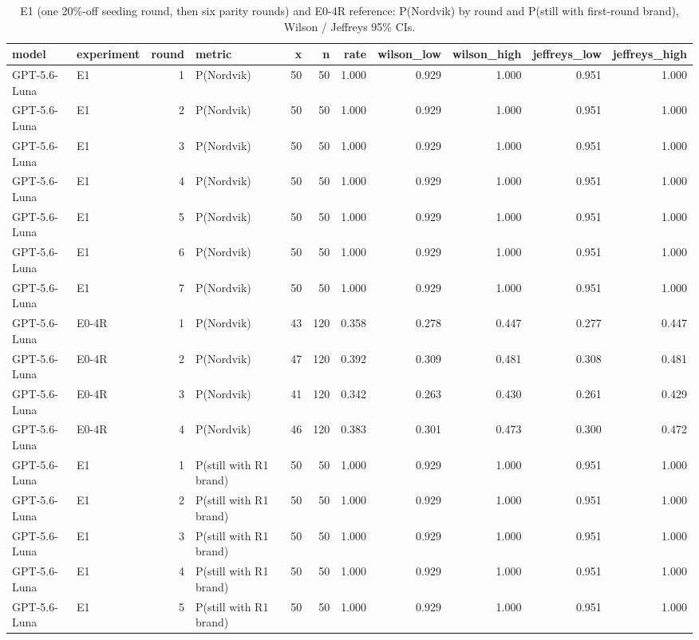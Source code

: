 \begin{table}[htbp]
\centering
\scriptsize
\caption{E1 (one 20\%-off seeding round, then six parity rounds) and E0-4R reference: P(Nordvik) by round and P(still with first-round brand), Wilson / Jeffreys 95\% CIs.}
\label{tab:tab07_e1_decay_curves}
\begin{tabular}{llrlrrrrrrr}
\toprule
model & experiment & round & metric & x & n & rate & wilson\_low & wilson\_high & jeffreys\_low & jeffreys\_high \\
\midrule
GPT-5.6-Luna & E1 & 1 & P(Nordvik) & 50 & 50 & 1.000 & 0.929 & 1.000 & 0.951 & 1.000 \\
GPT-5.6-Luna & E1 & 2 & P(Nordvik) & 50 & 50 & 1.000 & 0.929 & 1.000 & 0.951 & 1.000 \\
GPT-5.6-Luna & E1 & 3 & P(Nordvik) & 50 & 50 & 1.000 & 0.929 & 1.000 & 0.951 & 1.000 \\
GPT-5.6-Luna & E1 & 4 & P(Nordvik) & 50 & 50 & 1.000 & 0.929 & 1.000 & 0.951 & 1.000 \\
GPT-5.6-Luna & E1 & 5 & P(Nordvik) & 50 & 50 & 1.000 & 0.929 & 1.000 & 0.951 & 1.000 \\
GPT-5.6-Luna & E1 & 6 & P(Nordvik) & 50 & 50 & 1.000 & 0.929 & 1.000 & 0.951 & 1.000 \\
GPT-5.6-Luna & E1 & 7 & P(Nordvik) & 50 & 50 & 1.000 & 0.929 & 1.000 & 0.951 & 1.000 \\
GPT-5.6-Luna & E0-4R & 1 & P(Nordvik) & 43 & 120 & 0.358 & 0.278 & 0.447 & 0.277 & 0.447 \\
GPT-5.6-Luna & E0-4R & 2 & P(Nordvik) & 47 & 120 & 0.392 & 0.309 & 0.481 & 0.308 & 0.481 \\
GPT-5.6-Luna & E0-4R & 3 & P(Nordvik) & 41 & 120 & 0.342 & 0.263 & 0.430 & 0.261 & 0.429 \\
GPT-5.6-Luna & E0-4R & 4 & P(Nordvik) & 46 & 120 & 0.383 & 0.301 & 0.473 & 0.300 & 0.472 \\
GPT-5.6-Luna & E1 & 1 & P(still with R1 brand) & 50 & 50 & 1.000 & 0.929 & 1.000 & 0.951 & 1.000 \\
GPT-5.6-Luna & E1 & 2 & P(still with R1 brand) & 50 & 50 & 1.000 & 0.929 & 1.000 & 0.951 & 1.000 \\
GPT-5.6-Luna & E1 & 3 & P(still with R1 brand) & 50 & 50 & 1.000 & 0.929 & 1.000 & 0.951 & 1.000 \\
GPT-5.6-Luna & E1 & 4 & P(still with R1 brand) & 50 & 50 & 1.000 & 0.929 & 1.000 & 0.951 & 1.000 \\
GPT-5.6-Luna & E1 & 5 & P(still with R1 brand) & 50 & 50 & 1.000 & 0.929 & 1.000 & 0.951 & 1.000 \\

\end{tabular}
\end{table}
